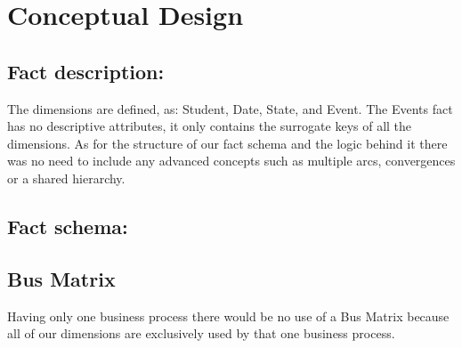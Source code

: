 
\section{Conceptual Design}

\subsection{Fact description:}

The dimensions are defined, as: Student, Date, State, and Event. The Events fact has no descriptive attributes, it only contains the surrogate keys of all the dimensions.
As for the structure of our fact schema and the logic behind it there was no need to include any advanced concepts such as multiple arcs, convergences or a shared hierarchy. 


\subsection{Fact schema:}

\begin{center}
	
\end{center}

\subsection{Bus Matrix}
	
Having only one business process there would be no use of a Bus Matrix because all of our dimensions are exclusively used by that one business process.